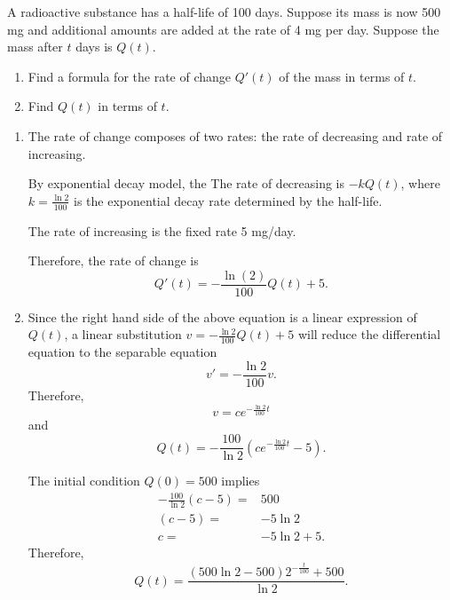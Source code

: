 \begin{example}
  A radioactive substance has a half-life of 100 days. Suppose its mass is now 500 mg and additional amounts are added at the rate of 4 mg per day. Suppose the mass after $t$ days is $Q(t)$.
  
  \begin{enumerate}
    \item 
    Find a formula for the rate of change $Q'(t)$ of the mass in terms of $t$.
    \item Find $Q(t)$ in terms of $t$.
  \end{enumerate}
\end{example}
\begin{solution}
  \begin{enumerate}
    \item 
    The rate of change composes of two rates: the rate of decreasing and rate of increasing. 
    
    By exponential decay model, the The rate of decreasing is $-kQ(t)$, where $k=\frac{\ln 2}{100}$ is the exponential decay rate determined by the half-life.
  
    The rate of increasing is the fixed rate 5 mg/day.
  
    Therefore, the rate of change is
    \[Q'(t)=-\frac{\ln(2)}{100}Q(t)+5.\]
  
    \item 
    Since the right hand side of the above equation is a linear expression of $Q(t)$, a linear substitution $v=-\frac{\ln2}{100}Q(t)+5$ will reduce the differential equation to the separable equation
    \[v'=-\frac{\ln2}{100}v.\]
    Therefore,
    \[v=ce^{-\frac{\ln2}{100}t}\]
    and
    \[Q(t)=-\frac{100}{\ln2}\left(ce^{-\frac{\ln2}{100}t}-5\right).\]

    The initial condition $Q(0)=500$ implies
    \[
    \begin{aligned}
      -\frac{100}{\ln2}\left(c-5\right)=&500\\
      \left(c-5\right)=&-5\ln 2\\
      c=&-5\ln 2+5.
    \end{aligned}  
    \]
    Therefore, 
    \[Q(t)=\frac{(500\ln2-500)2^{-\frac{t}{100}}+500}{\ln2}.\]
  \end{enumerate}
\end{solution}

